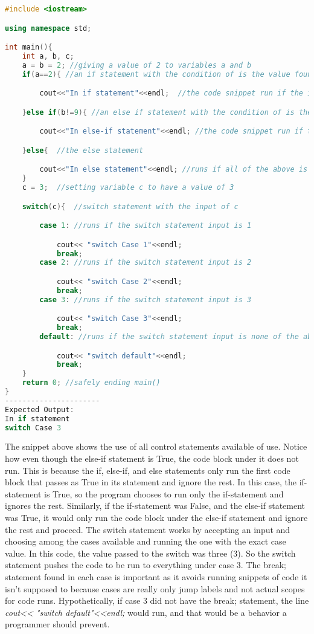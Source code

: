 \documentclass[12pt]{article}
\begin{document}
\begin{lstlisting}[language=C++]
#include <iostream>

using namespace std;

int main(){
    int a, b, c;
    a = b = 2; //giving a value of 2 to variables a and b
    if(a==2){ //an if statement with the condition of is the value found in a equal to 2

        cout<<"In if statement"<<endl;  //the code snippet run if the if statement is true

    }else if(b!=9){ //an else if statement with the condition of is the value found in b not equal to 9

        cout<<"In else-if statement"<<endl; //the code snippet run if the else if statement is true

    }else{  //the else statement

        cout<<"In else statement"<<endl; //runs if all of the above is deteremined to be false
    }
    c = 3;  //setting variable c to have a value of 3

    switch(c){  //switch statement with the input of c

        case 1: //runs if the switch statement input is 1

            cout<< "switch Case 1"<<endl;
            break;
        case 2: //runs if the switch statement input is 2

            cout<< "switch Case 2"<<endl;
            break;
        case 3: //runs if the switch statement input is 3

            cout<< "switch Case 3"<<endl;
            break;
        default: //runs if the switch statement input is none of the above

            cout<< "switch default"<<endl;
            break;
    }
    return 0; //safely ending main()
}
----------------------
Expected Output:
In if statement
switch Case 3
\end{lstlisting}
The snippet above shows the use of all control statements available of use. Notice how even though the else-if statement is True, the code block under it does not run. This is because the if, else-if, and else statements only run the first code block that passes as True in its statement and ignore the rest. In this case, the if-statement is True, so the program chooses to run only the if-statement and ignores the rest. Similarly, if the if-statement was False, and the else-if statement was True, it would only run the code block under the else-if statement and ignore the rest and proceed. The switch statement works by accepting an input and choosing among the cases available and running the one with the exact case value. In this code, the value passed to the switch was three (3). So the switch statement pushes the code to be run to everything under case 3. The break; statement found in each case is important as it avoids running snippets of code it isn't supposed to because cases are really only jump labels and not actual scopes for code runs. Hypothetically, if case 3 did not have the break; statement, the line \textit{cout<< "switch default"<<endl;} would run, and that would be a behavior a programmer should prevent.
\end{document}

